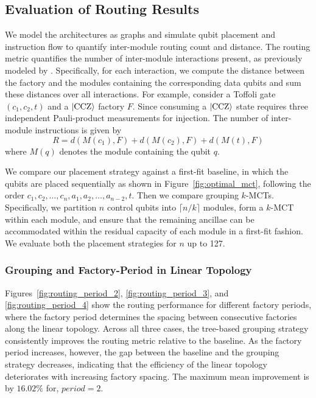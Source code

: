 \documentclass[sigconf]{acmart}
\newcommand{\anik}[1]{%
        \textcolor{blue}{\textbf{Anik:} #1}%
    }
\newcommand{\anik}[1]{}
\begin{document}
\subsection{Evaluation of Routing Results}
\label{sub:evaluation}
We model the architectures as graphs and simulate qubit placement and instruction flow to quantify inter-module routing count and distance. The routing metric quantifies the number of inter-module interactions present, as previously modeled by \cite{sethi2026optimizing}. Specifically, for each interaction, we compute the distance between the factory and the modules containing the corresponding data qubits and sum these distances over all interactions. For example, consider a Toffoli gate $(c_1,c_2,t)$ and a $\ket{\mathrm{CCZ}}$ factory $F$. Since consuming a $\ket{\mathrm{CCZ}}$ state requires three independent Pauli-product measurements for injection. The number of inter-module instructions is given by
$$R = d(M(c_1),F) + d(M(c_2),F) + d(M(t),F)$$
where $M(q)$ denotes the module containing the qubit $q$. 

We compare our placement strategy against a first-fit baseline, in which the qubits are placed sequentially as shown in Figure~\ref{fig:optimal_mct}, following the order $c_1,c_2,\ldots , c_n,a_1,a_2,\ldots ,a_{n-2},t$. Then we compare grouping $k$-MCTs. Specifically, we partition $n$ control qubits into $\lceil n/k \rceil$ modules, form a $k$-MCT within each module, and ensure that the remaining ancillae can be accommodated within the residual capacity of each module in a first-fit fashion. We evaluate both the placement strategies for $n$ up to 127.

%
\subsubsection{Grouping and Factory-Period in Linear Topology}
Figures~\ref{fig:routing_period_2}, \ref{fig:routing_period_3}, and \ref{fig:routing_period_4} show the routing performance for different factory periods, where the factory period determines the spacing between consecutive factories along the linear topology. Across all three cases, the tree-based grouping strategy consistently improves the routing metric relative to the baseline. As the factory period increases, however, the gap between the baseline and the grouping strategy decreases, indicating that the efficiency of the linear topology deteriorates with increasing factory spacing. The maximum mean improvement is by $16.02\%$ for, $period = 2$. 
\end{document}
